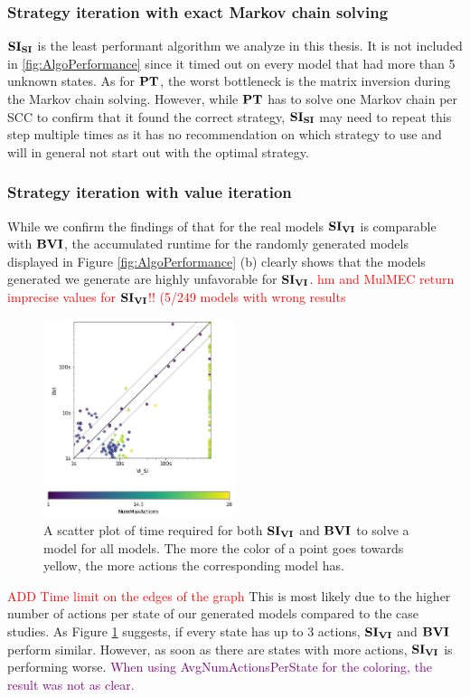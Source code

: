 \subsubsection*{Strategy iteration with exact Markov chain solving}
$\mathbf{SI_{SI}}$ is the least performant algorithm we analyze in this thesis.
It is not included in \ref{fig:AlgoPerformance} since it timed out on every model that had more than 5 unknown states.
As for $\mathbf{PT}$, the worst bottleneck is the matrix inversion during the Markov chain solving.
However, while $\mathbf{PT}$ has to solve one Markov chain per SCC to confirm that it found the correct strategy,
$\mathbf{SI_{SI}}$ may need to repeat this step multiple times as it has no recommendation on which strategy to use and will in general not start out with the optimal strategy.

\subsubsection*{Strategy iteration with value iteration}
While we confirm the findings of \cite{gandalf} that for the real models $\SI$ is comparable with $\BVI$, 
the accumulated runtime for the randomly generated models displayed in Figure \ref{fig:AlgoPerformance} (b) clearly shows that 
the models generated we generate are highly unfavorable for $\SI$.
\textcolor{red}{hm and MulMEC return imprecise values for $\SI$!! (5/249 models with wrong results}

\begin{figure}[h!]
    \centering
    \includegraphics[width=0.5\textwidth]{figures/colorScatter_SI_VI.jpg}
    \caption[$\SI$ compared to $\BVI$ based on MaxNumActions]{
        A scatter plot of time required for both $\SI$ and $\BVI$ to solve a model for all models.
        The more the color of a point goes towards yellow, the more actions the corresponding model has.
    }
    \label{fig:colorScatterSi}
\end{figure}
\FloatBarrier
\textcolor{red}{ADD Time limit on the edges of the graph}
This is most likely due to the higher number of actions per state of our generated models compared to the case studies.
As Figure \ref{fig:colorScatterSi} suggests, if every state has up to 3 actions, $\SI$ and $\BVI$ perform similar.
However, as soon as there are states with more  actions, $\SI$ is performing worse.
\textcolor{purple}{When using AvgNumActionsPerState for the coloring, the result was not as clear.}

